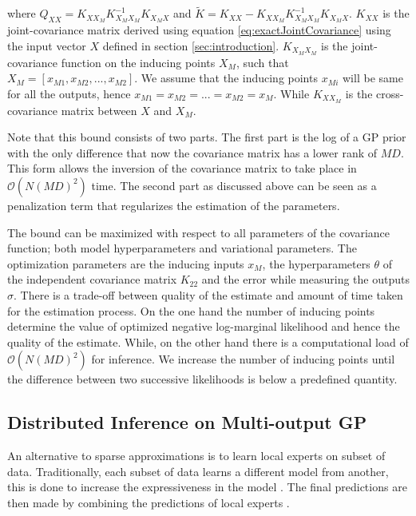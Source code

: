 where \(Q_{XX} = K_{XX_{M}}K_{X_{M}X_{M}}^{-1}K_{X_{M}X}\) and \(\tilde{K} = K_{XX} - K_{XX_{M}}K_{X_{M}X_{M}}^{-1}K_{X_{M}X}\). \(K_{XX}\) is the joint-covariance matrix derived using equation \ref{eq:exactJointCovariance} using the input vector \(X\) defined in section \ref{sec:introduction}. \(K_{X_{M}X_{M}}\) is the joint-covariance function on the inducing points \(X_{M}\), such that \(X_{M} = [x_{M1}, x_{M2}, ..., x_{M2}]\). We assume that the inducing points \(x_{Mi}\) will be same for all the outputs, hence \(x_{M1} = x_{M2} = ... = x_{M2} = x_{M}\). While \(K_{XX_{M}}\) is the cross-covariance matrix between \(X\) and \(X_{M}\). 

Note that this bound consists of two parts. The first part is the log of a GP prior with the only difference that now the covariance matrix has a lower rank of \(MD\). This form allows the inversion of the covariance matrix to take place in \(\mathcal{O}\left ( N(MD)^{2} \right )\) time. The second part as discussed above can be seen as a penalization term that regularizes the estimation of the parameters. 

The bound can be maximized with respect to all parameters of the covariance function; both model hyperparameters and variational parameters. The optimization parameters are the inducing inputs \(x_{M}\), the hyperparameters \(\theta\) of the independent covariance matrix \(K_{22}\) and the error while measuring the outputs \(\sigma\). There is a trade-off between quality of the estimate and amount of time taken for the estimation process. On the one hand the number of inducing points determine the value of optimized negative log-marginal likelihood and hence the quality of the estimate. While, on the other hand there is a computational load of \(\mathcal{O}\left ( N(MD)^{2} \right )\) for inference. We increase the number of inducing points until the difference between two successive likelihoods is below a predefined quantity.   

\subsection{Distributed Inference on Multi-output GP}\label{sec:dMOGP}
An alternative to sparse approximations is to learn local experts on subset of data. Traditionally, each subset of data learns a different model from another, this is done to increase the expressiveness in the model \cite{rasmussen2002infinite}. The final predictions are then made by combining the predictions of local experts \cite{chen2009bagging}. 

